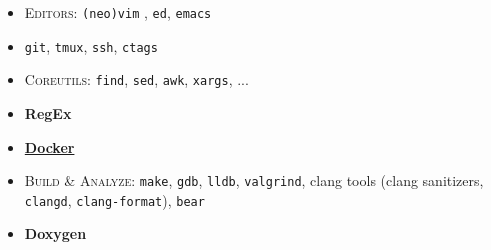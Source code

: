 %
%
%

\twocolumnsection
{
\begin{skills}
\end{skills}}
{
\vspace{1em}
\begin{itemize}
    \item \textsc{Editors}: \texttt{(neo)vim} , \texttt{ed}, \texttt{emacs}
    \item \texttt{git}, \texttt{tmux}, \texttt{ssh}, \texttt{ctags}
    \item \textsc{Coreutils}: \texttt{find}, \texttt{sed}, \texttt{awk}, \texttt{xargs}, ...
    \item \textbf{RegEx}
    \item \href{https://gist.github.com/reverseila/33d9173c872fb34efa055326859b0c5b}{\color{basecolor} \textbf{Docker}}
    \item \textsc{Build \& Analyze}: \texttt{make}, \texttt{gdb}, \texttt{lldb}, \texttt{valgrind}, clang tools (clang sanitizers, \texttt{clangd}, \texttt{clang-format}), \texttt{bear}
    \item \textbf{Doxygen}
\end{itemize}
}
